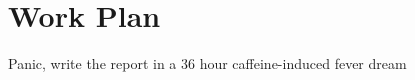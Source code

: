 \section{Work Plan}\label{sec:work_plan}

Panic, write the report in a 36 hour caffeine-induced fever dream
